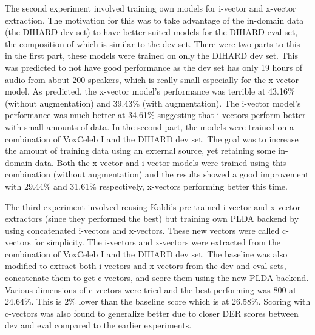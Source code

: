 		The second experiment involved training own models for i-vector and x-vector extraction. The motivation for this was to take advantage of the in-domain data (the DIHARD dev set) to have better suited models for the DIHARD eval set, the composition of which is similar to the dev set. There were two parts to this - in the first part, these models were trained on only the DIHARD dev set. This was predicted to not have good performance as the dev set has only 19 hours of audio from about 200 speakers, which is really small especially for the x-vector model. As predicted, the x-vector model's performance was terrible at 43.16\% (without augmentation) and 39.43\% (with augmentation). The i-vector model's performance was much better at 34.61\% suggesting that i-vectors perform better with small amounts of data. In the second part, the models were trained on a combination of VoxCeleb I and the DIHARD dev set. The goal was to increase the amount of training data using an external source, yet retaining some in-domain data. Both the x-vector and i-vector models were trained using this combination (without augmentation) and the results showed a good improvement with 29.44\% and 31.61\% respectively, x-vectors performing better this time.
		
		The third experiment involved reusing Kaldi's pre-trained i-vector and x-vector extractors (since they performed the best) but training own PLDA backend by using concatenated i-vectors and x-vectors. These new vectors were called c-vectors for simplicity. The i-vectors and x-vectors were extracted from the combination of VoxCeleb I and the DIHARD dev set. The baseline was also modified to extract both i-vectors and x-vectors from the dev and eval sets, concatenate them to get c-vectors, and score them using the new PLDA backend. Various dimensions of c-vectors were tried and the best performing was 800 at 24.64\%. This is 2\% lower than the baseline score which is at 26.58\%. Scoring with c-vectors was also found to generalize better due to closer DER scores between dev and eval compared to the earlier experiments.
		